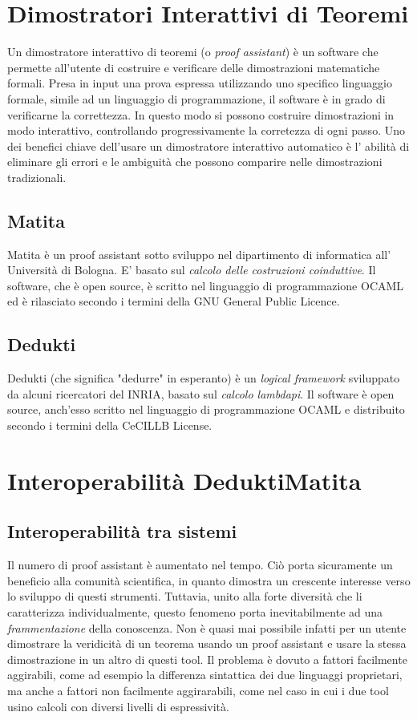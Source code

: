 \documentclass[12pt,a4paper]{report}
\begin{document}
\section{Dimostratori Interattivi di Teoremi}
Un dimostratore interattivo di teoremi (o \textit{proof assistant}) è un software 
che permette all'utente di costruire e verificare delle dimostrazioni matematiche
formali. Presa in input una prova espressa utilizzando uno specifico linguaggio 
formale, simile ad un linguaggio di programmazione, il software è in grado di
verificarne la correttezza. In questo modo si possono costruire dimostrazioni
in modo interattivo, controllando progressivamente la corretezza di ogni passo.
Uno dei benefici chiave dell'usare un dimostratore interattivo automatico è l'
abilità di eliminare gli errori e le ambiguità che possono comparire nelle 
dimostrazioni tradizionali.

\subsection{Matita}
Matita è un  proof assistant sotto sviluppo nel dipartimento di informatica all'
Università di Bologna. E' basato sul \textit{calcolo delle costruzioni coinduttive}.
Il software, che è open source, è scritto nel linguaggio di programmazione OCAML 
ed è rilasciato secondo i termini della GNU General Public Licence.

\subsection{Dedukti}
Dedukti (che significa "dedurre" in esperanto) è un \textit{logical framework}
sviluppato da alcuni ricercatori del INRIA, basato sul \textit{calcolo lambda\-pi}.
Il software è open source, anch'esso scritto nel linguaggio di programmazione OCAML
e distribuito secondo i termini della CeCILL\-B License.

\section{Interoperabilità Dedukti\-Matita}

\subsection{Interoperabilità tra sistemi}
Il numero di proof assistant è aumentato nel tempo. Ciò porta sicuramente un
beneficio alla comunità scientifica, in quanto dimostra un crescente interesse
verso lo sviluppo di questi strumenti. Tuttavia, unito alla forte diversità che
li caratterizza individualmente, questo fenomeno porta inevitabilmente
ad una \textit{frammentazione} della conoscenza. Non è quasi mai possibile infatti
per un utente dimostrare la veridicità di un teorema usando un proof assistant
e usare la stessa dimostrazione in un altro di questi tool. Il problema è dovuto
a fattori facilmente aggirabili, come ad esempio la differenza sintattica dei due
linguaggi proprietari, ma anche a fattori non facilmente aggirarabili, come nel
caso in cui i due tool usino calcoli con diversi livelli di espressività.
\end{document}
